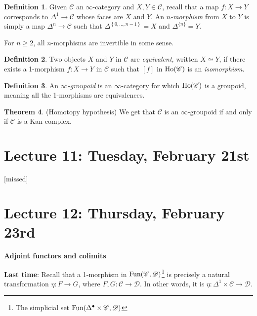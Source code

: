 \documentclass[12pt]{amsart}
\theoremstyle{definition}
\newtheorem{theorem}{Theorem}[section]
\newtheorem{definition}[theorem]{Definition}
\begin{document}
\begin{definition} Given $\mathscr{C}$ an $\infty$-category and $X,Y\in \mathscr{C}$, recall that a map $f: X \to Y$ corresponds to $\Delta^1 \to \mathscr{C}$ whose faces are $X$ and $Y$. An \textit{$n$-morphism} from $X$ to $Y$ is simply a map $\Delta^n \to \mathscr{C}$ such that $\Delta^{\left\{ 0, \ldots, n-1 \right\}} = X$ and $\Delta^{\{n\}} = Y$.
\end{definition}

For $n\ge 2$, all $n$-morphisms are invertible in some sense.

\begin{definition} Two objects $X$ and $Y$ in $\mathscr{C}$ are \textit{equivalent}, written $X \simeq Y$, if there exists a 1-morphism $f: X \to Y$ in $\mathscr{C}$ such that $[f]$ in $\text{Ho}(\mathscr{C})$ is an \textit{isomorphism}.
\end{definition}

\begin{definition} An $\infty$\textit{-groupoid} is an $\infty$-category for which $\text{Ho}(\mathscr{C})$ is a groupoid, meaning all the 1-morphisms are equivalences.
\end{definition}

\begin{theorem} (Homotopy hypothesis) We get that $\mathscr{C}$ is an $\infty$-groupoid if and only if $\mathscr{C}$ is a Kan complex.
\end{theorem}

\section{Lecture 11: Tuesday, February 21st}

[missed]

\section{Lecture 12: Thursday, February 23rd}

\begin{center}
    \textbf{Adjoint functors and colimits}
\end{center}

\textbf{Last time}: Recall that a 1-morphism in $\text{Fun}(\mathscr{C},\mathscr{D})$\footnote{The simplicial set $\text{Fun}(\Delta^\bullet \times \mathscr{C}, \mathscr{D})$} is precisely a natural transformation $\eta: F \to G$, where $F,G: \mathscr{C} \to \mathscr{D}$. In other words, it is $\eta: \Delta^1 \times \mathscr{C} \to \mathscr{D}$.
\end{document}
